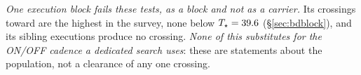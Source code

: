 \emph{One execution block fails these tests, as a block and not as a
carrier.} Its \DqBlockNCross{} crossings toward
\LgVerRejectStar{} are the \DqBlockNCross{} highest in the survey, none below
$T_\star=39.6$ (\S\ref{sec:bdblock}), and its \BdNSibling{} sibling
executions produce no crossing. \emph{None of this substitutes for the ON/OFF
cadence a dedicated search uses}: these are statements about the population,
not a clearance of any one crossing.

